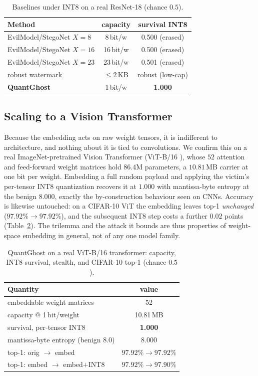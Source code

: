 \documentclass[10pt,journal]{IEEEtran}
\theoremstyle{remark}
\newcommand{\sys}{\mbox{QuantGhost}}
\begin{document}
\begin{table}[!tb]\centering
\caption{Baselines under INT8 on a real ResNet-18 (chance $0.5$).}
\label{tab:baseline}
\begin{tabular*}{\columnwidth}{@{\extracolsep{\fill}}lcc@{}}
\toprule
Method & capacity & survival INT8\\
\midrule
EvilModel/StegoNet $X{=}8$ & 8\,bit/w & 0.500 (erased)\\
EvilModel/StegoNet $X{=}16$ & 16\,bit/w & 0.500 (erased)\\
EvilModel/StegoNet $X{=}23$ & 23\,bit/w & 0.501 (erased)\\
robust watermark & $\le$2\,KB & robust (low-cap)\\
\textbf{\sys} & 1\,bit/w & \textbf{1.000}\\
\bottomrule
\end{tabular*}
\end{table}

\subsection{Scaling to a Vision Transformer}\label{sec:vit}
Because the embedding acts on raw weight tensors, it is indifferent to architecture, and
nothing about it is tied to convolutions. We confirm this on a real ImageNet-pretrained
Vision Transformer (ViT-B/16 \cite{dosovitskiy2021vit}), whose $52$ attention and
feed-forward weight matrices hold $86.4$M parameters, a $10.81$\,MB carrier at one bit per
weight. Embedding a full random payload and applying the victim's per-tensor INT8
quantization recovers it at $1.000$ with mantissa-byte entropy at the benign $8.000$,
exactly the by-construction behaviour seen on CNNs. Accuracy is likewise untouched: on a
CIFAR-10 ViT the embedding leaves top-1 \emph{unchanged} ($97.92\%\!\to\!97.92\%$), and the
subsequent INT8 step costs a further $0.02$ points (Table~\ref{tab:vit}). The trilemma and
the attack it bounds are thus properties of weight-space embedding in general, not of any
one model family.

\begin{table}[!tb]\centering
\caption{\sys{} on a real ViT-B/16 transformer: capacity, INT8 survival, stealth, and
CIFAR-10 top-1 (chance $0.5$).}
\label{tab:vit}
\begin{tabular*}{\columnwidth}{@{\extracolsep{\fill}}lc@{}}
\toprule
Quantity & value\\
\midrule
embeddable weight matrices & 52\\
capacity @ 1\,bit/weight & 10.81\,MB\\
survival, per-tensor INT8 & \textbf{1.000}\\
mantissa-byte entropy (benign $8.0$) & 8.000\\
top-1: orig $\to$ embed & $97.92\%\to97.92\%$\\
top-1: embed $\to$ embed$+$INT8 & $97.92\%\to97.90\%$\\
\bottomrule
\end{tabular*}
\end{table}
\end{document}
